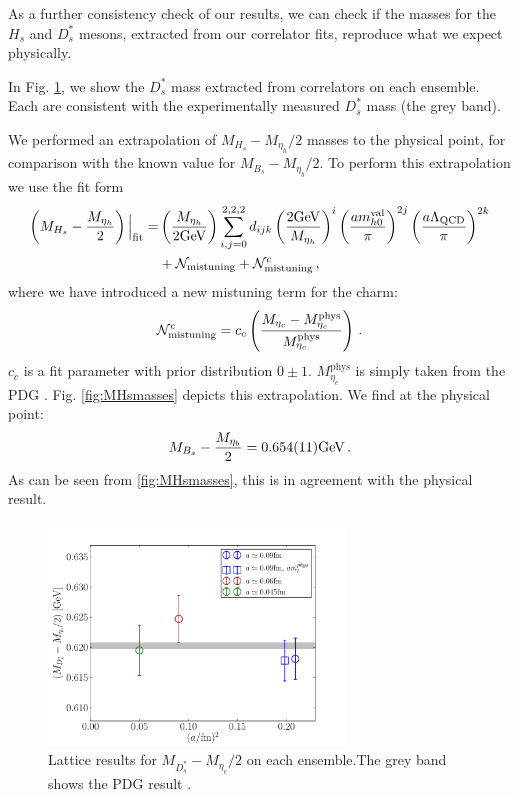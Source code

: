 As a further consistency check of our results, we can check if the masses for the $H_s$ and $D_s^*$ mesons, extracted from our correlator fits, reproduce what we expect physically.

In Fig. \ref{fig:Dsmasses}, we show the $D_s^*$ mass extracted from correlators on each ensemble. Each are consistent with the experimentally measured $D_s^*$ mass (the grey band).

We performed an extrapolation of $M_{H_s}-M_{\eta_h}/2$ masses to the physical point, for comparison with the known value for $M_{B_s}-M_{\eta_b}/2$. To perform this extrapolation we use the fit form
\begin{align}
  \left(M_{H_s}-{M_{\eta_h}\over2}\right)\Big|_{\text{fit}} =& \left({M_{\eta_h}\over 2\text{GeV}}\right) \sum_{i,j=0}^{2,2,2} d_{ijk} \left({2\text{GeV}\over M_{\eta_h} }\right)^{i} \left({ am^{\text{val}}_{h0} \over \pi }\right)^{2j} \left({ a\Lambda_{\text{QCD}} \over \pi }\right)^{2k} \\
  &+ \mathcal{N}_{\text{mistuning}} + \mathcal{N}^c_{\text{mistuning}}\,,
  \nonumber
\end{align}
where we have introduced a new mistuning term for the charm:
\begin{align}
  \mathcal{N}^c_{\text{mistuning}} = c_c \left({M_{\eta_c}-M_{\eta_c}^{\text{phys}}\over M_{\eta_c}^{\text{phys}}}\right)\,.
\end{align}
$c_c$ is a fit parameter with prior distribution $0\pm 1$. $M_{\eta_c}^{\text{phys}}$ is simply taken from the PDG \cite{PhysRevD.98.030001}. Fig. \ref{fig:MHsmasses} depicts this extrapolation. We find at the physical point:
\begin{align}
  M_{B_s} - {M_{\eta_b}\over 2} =  0.654(11) \text{GeV}\,.
\end{align}
As can be seen from \ref{fig:MHsmasses}, this is in agreement with the physical result.

\begin{figure}[htb!]
  \begin{center}
  \includegraphics[width=0.70\textwidth]{images/BsDsstar/Dsmasses.pdf}
  \caption{Lattice results for $M_{D_s^*}-M_{\eta_c}/2$ on each ensemble.The grey band shows the PDG result \cite{PhysRevD.98.030001}. \label{fig:Dsmasses}}
  \end{center}
\end{figure}

